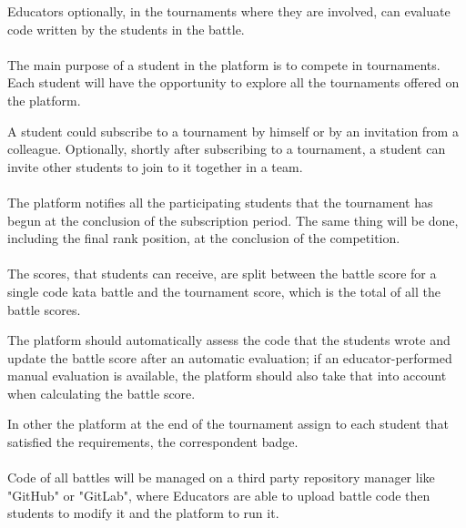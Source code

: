 Educators optionally, in the tournaments where they are involved, can evaluate code written by the students in the battle.\\
\\
The main purpose of a student in the platform is to compete in tournaments.\\
Each student will have the opportunity to explore all the tournaments offered on the platform.

A student could subscribe to a tournament by himself or by an invitation from a colleague. Optionally, shortly after subscribing to a tournament, a student can invite other students to join to it together in a team.\\
\\
The platform notifies all the participating students that the tournament has begun at the conclusion of the subscription period. The same thing will be done, including the final rank position, at the conclusion of the competition.\\
\\
The scores, that students can receive, are split between the battle score for a single code kata battle and the tournament score, which is the total of all the battle scores.

The platform should automatically assess the code that the students wrote and update the battle score after an automatic evaluation; if an educator-performed manual evaluation is available, the platform should also take that into account when calculating the 
battle score.

In other the platform at the end of the tournament assign to each student that satisfied the requirements, the correspondent badge.\\
\\
Code of all battles will be managed on a third party repository manager like "GitHub" or "GitLab", where Educators are able to upload battle code then students to modify it and the platform to run it.

\newpage

